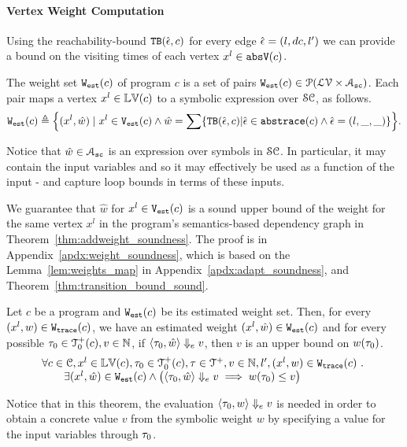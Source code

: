 \paragraph{Vertex Weight Computation}
Using the reachability-bound ${\mathtt{TB}}(\hat{\mathtt{\epsilon}{}}, c)$ for every edge $\hat{\mathtt{\epsilon}{}} = (l, dc, l')$ we can provide a bound on the visiting times of each vertex $x^l \in \mathtt{abs}{\mathtt{V}}(c)$.
\begin{defn}
 \label{def:adaptfun-weight}
The weight set $\mathtt{{W_{est}}}(c)$ of program $c$ is a set of pairs $\mathtt{{W_{est}}}(c) \in \mathcal{P}(\mathcal{LV} \times \mathcal{A}_{\mathtt{sc}})$.
Each pair maps
a vertex $x^l \in \mathbb{LV}(c)$ to a symbolic expression over $\mathcal{SC}$,
as follows.
 \[
 \progW(c) \triangleq
 \left\{ (x^l, \hat{w}) 
\mid
x^l \in \progV(c) 
\land 
\hat{w} = 
\sum\left\{ \absclr(\absevent, c) \middle\vert \absevent \in \absflow(c) \land \absevent = (l, \_, \_) \right\}
\right\}.
\]
\end{defn}
%
Notice that $\hat{w} \in \mathcal{A}_{\mathtt{sc}}$ is an expression over symbols in $\mathcal{SC}$. In particular, it may contain the input variables and so it may effectively be used as a function of the input - and capture loop bounds in terms of these inputs.
 
We guarantee that $\hat{w}$ for $x^l \in \mathtt{{V_{est}}}(c)$ is a sound upper bound of 
the weight for the same vertex $x^l$ in the program's semantics-based dependency graph
in Theorem~\ref{thm:addweight_soundness}.
The proof is in Appendix~\ref{apdx:weight_soundness}, which is based on the Lemma~\ref{lem:weights_map}
in Appendix~\ref{apdx:adapt_soundness}, and Theorem~\ref{thm:transition_bound_sound}.

\begin{thm}
 \label{thm:addweight_soundness}
Let ${c}$ be a program and $\mathtt{{W_{est}}}(c)$ be its estimated weight set.
Then, for every  $(x^l, w) \in \mathtt{{W_{trace}}}(c) $,
we have an estimated weight $(x^l, \hat{w}) \in \mathtt{{W_{est}}}(c)$ and for every possible 
$\mathtt{\tau}_0 \in \mathcal{T}^{+}_0(c),
v \in \mathbb{N}$,
if $\langle \mathtt{\tau}_0, \hat{w} \rangle \Downarrow_e v$,
then $v$ is an upper bound on ${w}(\mathtt{\tau}_0)$.
\[
 \begin{array}{l}
 \forall c \in \mathcal{C}, x^l \in \mathbb{LV}(c),\mathtt{\tau}_0 \in \mathcal{T}^{+}_0(c), \mathtt{\tau} \in \mathcal{T}^{+},
v \in \mathbb{N}, l', (x^l, w) \in \mathtt{{W_{trace}}}(c) ~.~
\\ \qquad 
\exists
(x^l, \hat{w}) \in \mathtt{{W_{est}}}(c) 
\land
\big(
 \langle \mathtt{\tau}_0, \hat{w} \rangle \Downarrow_e v \implies w(\mathtt{\tau}_0) \leq v
\big)
\end{array}
\]
\end{thm}
Notice that in this theorem, the evaluation $\langle \mathtt{\tau}_0, w \rangle \Downarrow_e v$ is needed in order to obtain a concrete value $v$ from the symbolic weight $w$ by specifying a value for the input variables through $\mathtt{\tau}_0$.


